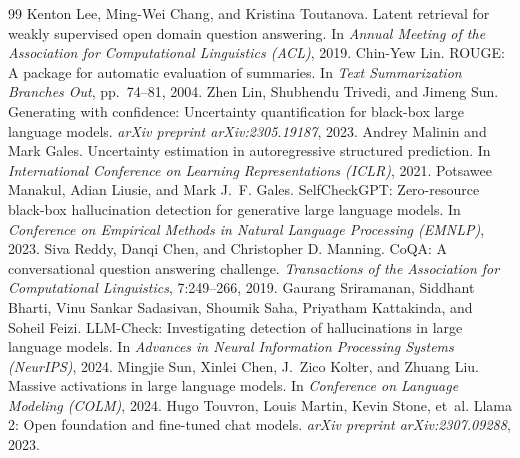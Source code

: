 \documentclass[10pt]{article}
\begin{document}
\begin{thebibliography}{99}
 Kenton Lee, Ming-Wei Chang, and Kristina Toutanova. Latent retrieval for weakly supervised open domain question answering. In \emph{Annual Meeting of the Association for Computational Linguistics (ACL)}, 2019.
 Chin-Yew Lin. ROUGE: A package for automatic evaluation of summaries. In \emph{Text Summarization Branches Out}, pp.~74--81, 2004.
 Zhen Lin, Shubhendu Trivedi, and Jimeng Sun. Generating with confidence: Uncertainty quantification for black-box large language models. \emph{arXiv preprint arXiv:2305.19187}, 2023.
 Andrey Malinin and Mark Gales. Uncertainty estimation in autoregressive structured prediction. In \emph{International Conference on Learning Representations (ICLR)}, 2021.
 Potsawee Manakul, Adian Liusie, and Mark J.~F. Gales. SelfCheckGPT: Zero-resource black-box hallucination detection for generative large language models. In \emph{Conference on Empirical Methods in Natural Language Processing (EMNLP)}, 2023.
 Siva Reddy, Danqi Chen, and Christopher D. Manning. CoQA: A conversational question answering challenge. \emph{Transactions of the Association for Computational Linguistics}, 7:249--266, 2019.
 Gaurang Sriramanan, Siddhant Bharti, Vinu Sankar Sadasivan, Shoumik Saha, Priyatham Kattakinda, and Soheil Feizi. LLM-Check: Investigating detection of hallucinations in large language models. In \emph{Advances in Neural Information Processing Systems (NeurIPS)}, 2024.
 Mingjie Sun, Xinlei Chen, J.~Zico Kolter, and Zhuang Liu. Massive activations in large language models. In \emph{Conference on Language Modeling (COLM)}, 2024.
 Hugo Touvron, Louis Martin, Kevin Stone, et~al. Llama 2: Open foundation and fine-tuned chat models. \emph{arXiv preprint arXiv:2307.09288}, 2023.
\end{thebibliography}
\end{document}
